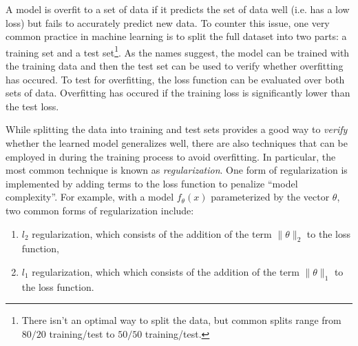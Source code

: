 A model is overfit to a set of data if it predicts the set of data well (i.e. has a low loss) but fails to accurately predict new data. To counter this issue, one very common practice in machine learning is to split the full dataset into two parts: a training set and a test set\footnote{There isn't an optimal way to split the data, but common splits range from $80/20$ training/test to $50/50$ training/test.}. As the names suggest, the model can be trained with the training data and then the test set can be used to verify whether overfitting has occured. To test for overfitting, the loss function can be evaluated over both sets of data. Overfitting has occured if the training loss is significantly lower than the test loss.

While splitting the data into training and test sets provides a good way to \textit{verify} whether the learned model generalizes well, there are also techniques that can be employed in during the training process to avoid overfitting. In particular, the most common technique is known as \textit{regularization}. One form of regularization is implemented by adding terms to the loss function to penalize ``model complexity''. For example, with a model $f_\theta(x)$ parameterized by the vector $\theta$, two common forms of regularization include:
\begin{enumerate}
    \item $l_2$ regularization, which consists of the addition of the term $\lVert \theta \rVert_2$ to the loss function,
    \item $l_1$ regularization, which which consists of the addition of the term $\lVert \theta \rVert_1$ to the loss function.
\end{enumerate}

